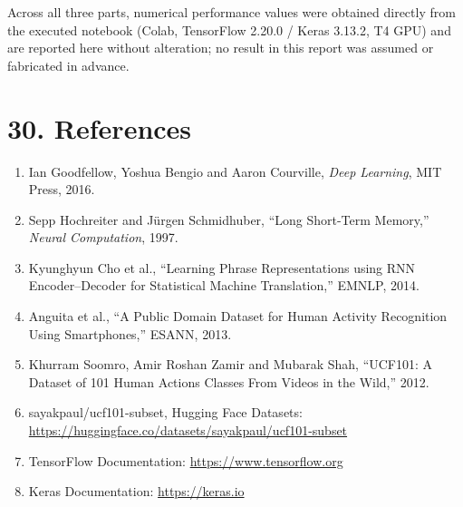 \documentclass[10pt]{article}
\begin{document}
Across all three parts, numerical performance values were obtained directly
from the executed notebook (Colab, TensorFlow 2.20.0 / Keras 3.13.2, T4
GPU) and are reported here without alteration; no result in this report was
assumed or fabricated in advance.

\section*{30. References}

\begin{enumerate}
\item Ian Goodfellow, Yoshua Bengio and Aaron Courville,
\emph{Deep Learning}, MIT Press, 2016.

\item Sepp Hochreiter and J\"urgen Schmidhuber,
``Long Short-Term Memory,'' \emph{Neural Computation}, 1997.

\item Kyunghyun Cho et al.,
``Learning Phrase Representations using RNN Encoder--Decoder for Statistical
Machine Translation,'' EMNLP, 2014.

\item Anguita et al.,
``A Public Domain Dataset for Human Activity Recognition Using Smartphones,''
ESANN, 2013.

\item Khurram Soomro, Amir Roshan Zamir and Mubarak Shah,
``UCF101: A Dataset of 101 Human Actions Classes From Videos in the Wild,''
2012.

\item sayakpaul/ucf101-subset, Hugging Face Datasets:
\url{https://huggingface.co/datasets/sayakpaul/ucf101-subset}

\item TensorFlow Documentation:
\url{https://www.tensorflow.org}

\item Keras Documentation:
\url{https://keras.io}
\end{enumerate}
\end{document}
